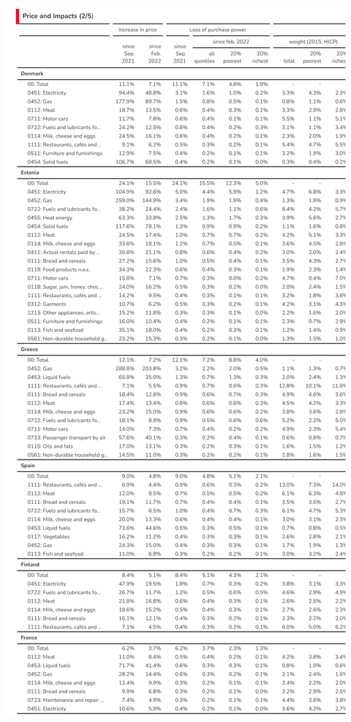 \documentclass[
  9pt,
  a4paper,
  numbers=noendperiod,
  DIV=12]{scrartcl}
\begin{document}
\includegraphics{svg/annex_2.png}
\end{document}
